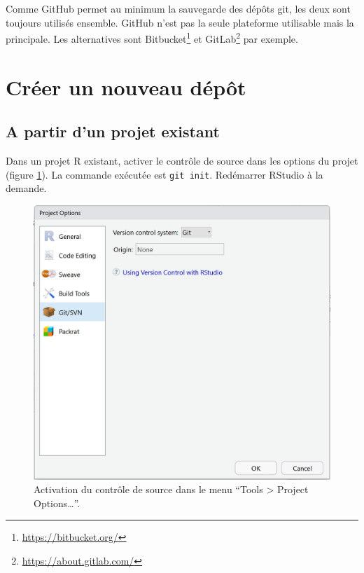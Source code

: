 \documentclass[
  12pt,
  french,
  a4paper,
  extrafontsizes,onecolumn,openright
  ]{memoir}
\begin{document}
Comme GitHub permet au minimum la sauvegarde des dépôts git, les deux sont toujours utilisés ensemble.
GitHub n'est pas la seule plateforme utilisable mais la principale.
Les alternatives sont Bitbucket\footnote{\url{https://bitbucket.org/}} et GitLab\footnote{\url{https://about.gitlab.com/}} par exemple.

\section{Créer un nouveau dépôt}\label{sec:creerdepot}

\subsection{A partir d'un projet existant}\label{a-partir-dun-projet-existant}

Dans un projet R existant, activer le contrôle de source dans les options du projet (figure \ref{fig:git-Project}).
La commande exécutée est \texttt{git\ init}.
Redémarrer RStudio à la demande.



\scriptsize

\begin{figure}

{\centering \includegraphics[width=0.8\linewidth]{images/git-Project} 

}

\caption{Activation du contrôle de source dans le menu \enquote{Tools \textgreater{} Project Options\ldots{}}.}\label{fig:git-Project}
\end{figure}
\end{document}
